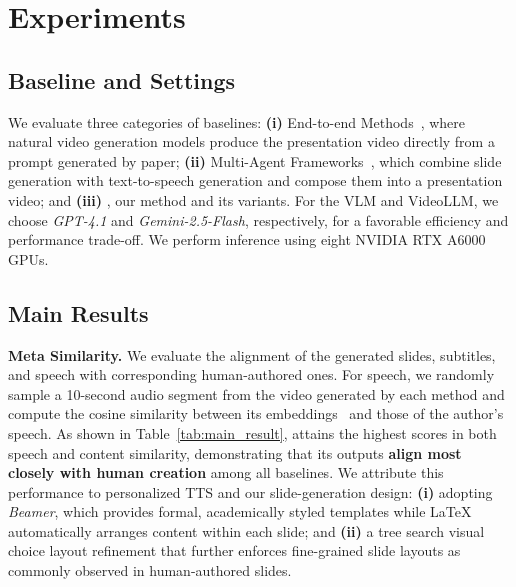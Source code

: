 



\vspace{-0.5\baselineskip} 
\section{Experiments}
\vspace{-0.4\baselineskip} 
\subsection{Baseline and Settings}
\vspace{-0.4\baselineskip} 
We evaluate three categories of baselines: \textbf{(i)} End-to-end Methods~\cite{wan,deepmind2025veo3}, where natural video generation models produce the presentation video directly from a prompt generated by paper; \textbf{(ii)} Multi-Agent Frameworks~\cite{shi2025presentagent,zheng2025pptagent}, which combine slide generation with text-to-speech generation and compose them into a presentation video; and \textbf{(iii)} {\agent}, our method and its variants. For the VLM and VideoLLM, we choose \textit{GPT-4.1} and \textit{Gemini-2.5-Flash}, respectively, for a favorable efficiency and performance trade-off. We perform inference using eight NVIDIA RTX A6000 GPUs.


\vspace{-0.4\baselineskip} 
\subsection{Main Results}
\vspace{-0.5\baselineskip} 
\textbf{Meta Similarity.} We evaluate the alignment of the generated slides, subtitles, and speech with corresponding human-authored ones. For speech, we randomly sample a 10-second audio segment from the video generated by each method and compute the cosine similarity between its embeddings~\cite{audio_embedding} and those of the author’s speech. As shown in Table~\ref{tab:main_result}, {\agent} attains the highest scores in both speech and content similarity, demonstrating that its outputs \textbf{align most closely with human creation} among all baselines. We attribute this performance to personalized TTS and our slide-generation design: \textbf{(i)} adopting \textit{Beamer}, which provides formal, academically styled templates while \LaTeX{} automatically arranges content within each slide; and \textbf{(ii)} a tree search visual choice layout refinement that further enforces fine-grained slide layouts as commonly observed in human-authored slides.


